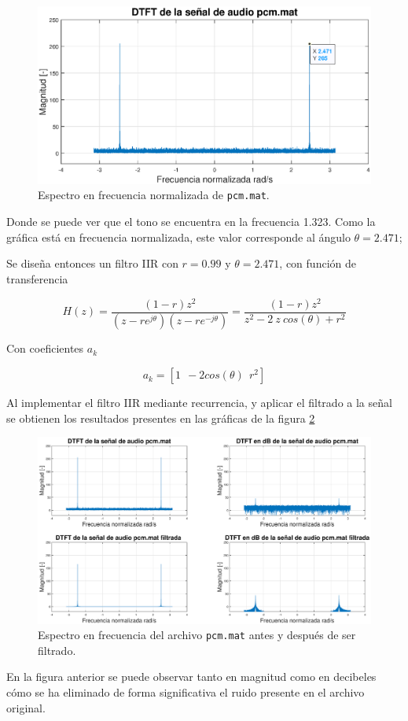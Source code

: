 \begin{figure}[H]
    \centering
\includegraphics[scale = 0.6]{Figuras/p1_4-DTFT_pcm.eps}
    \caption{Espectro en frecuencia normalizada de \texttt{pcm.mat}.}
    \label{dtft_pcm}
\end{figure}

Donde se puede ver que el tono se encuentra en la frecuencia 1.323. Como la gráfica está en frecuencia normalizada, este valor corresponde al ángulo $\theta = 2.471$;


Se diseña entonces un filtro IIR con $r = 0.99$ y $\theta = 2.471$,  con función de transferencia

$$  H(z) = \frac{(1-r)z^2}{(z-re^{j\theta})(z-re^{-j\theta})} = \frac{(1-r)z^2}{z^2 -2~z~cos(\theta) + r^2}$$

Con coeficientes $a_k$

$$ a_k = [1 ~~-2cos(\theta) ~~ r^2]$$




Al implementar el filtro IIR mediante recurrencia, y aplicar el filtrado a la señal se obtienen los resultados presentes en las gráficas de la figura \ref{IIR}

\begin{figure}[H]
    \centering
    \includegraphics[scale = 0.3]{Figuras/p1_4-pcm_filtrada.eps}
    \caption{Espectro en frecuencia del archivo \texttt{pcm.mat} antes y después de ser filtrado.}
    \label{IIR}
\end{figure}


En la figura anterior se puede observar tanto en magnitud como en decibeles cómo se ha eliminado de forma significativa  el ruido presente en el archivo original.



